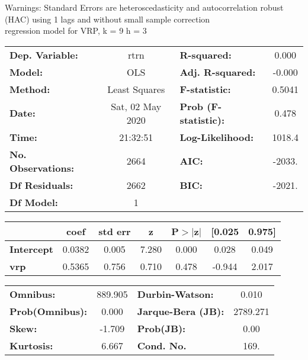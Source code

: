 Warnings: \newline
 [1] Standard Errors are heteroscedasticity and autocorrelation robust (HAC) using 1 lags and without small sample correction\\ 

regression model for VRP, k = 9 h = 3\begin{center}
\begin{tabular}{lclc}
\toprule
\textbf{Dep. Variable:}    &       rtrn       & \textbf{  R-squared:         } &     0.000   \\
\textbf{Model:}            &       OLS        & \textbf{  Adj. R-squared:    } &    -0.000   \\
\textbf{Method:}           &  Least Squares   & \textbf{  F-statistic:       } &    0.5041   \\
\textbf{Date:}             & Sat, 02 May 2020 & \textbf{  Prob (F-statistic):} &    0.478    \\
\textbf{Time:}             &     21:32:51     & \textbf{  Log-Likelihood:    } &    1018.4   \\
\textbf{No. Observations:} &        2664      & \textbf{  AIC:               } &    -2033.   \\
\textbf{Df Residuals:}     &        2662      & \textbf{  BIC:               } &    -2021.   \\
\textbf{Df Model:}         &           1      & \textbf{                     } &             \\
\bottomrule
\end{tabular}
\begin{tabular}{lcccccc}
                   & \textbf{coef} & \textbf{std err} & \textbf{z} & \textbf{P$> |$z$|$} & \textbf{[0.025} & \textbf{0.975]}  \\
\midrule
\textbf{Intercept} &       0.0382  &        0.005     &     7.280  &         0.000        &        0.028    &        0.049     \\
\textbf{vrp}       &       0.5365  &        0.756     &     0.710  &         0.478        &       -0.944    &        2.017     \\
\bottomrule
\end{tabular}
\begin{tabular}{lclc}
\textbf{Omnibus:}       & 889.905 & \textbf{  Durbin-Watson:     } &    0.010  \\
\textbf{Prob(Omnibus):} &   0.000 & \textbf{  Jarque-Bera (JB):  } & 2789.271  \\
\textbf{Skew:}          &  -1.709 & \textbf{  Prob(JB):          } &     0.00  \\
\textbf{Kurtosis:}      &   6.667 & \textbf{  Cond. No.          } &     169.  \\
\bottomrule
\end{tabular}
\end{center}

